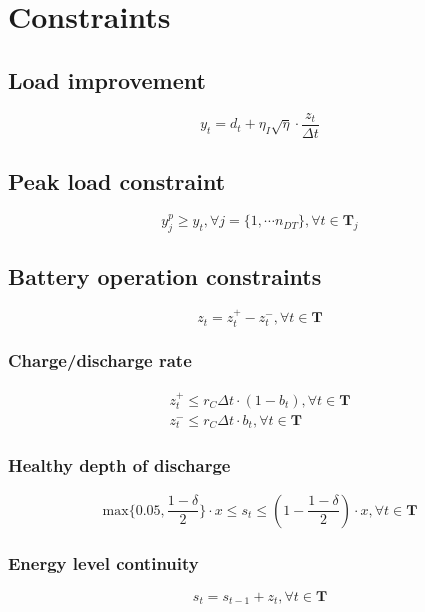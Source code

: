 \documentclass[11pt]{article}
\begin{document}
\section{Constraints}

\subsection{Load improvement}
\begin{equation}
y_t = d_t + \eta_I \sqrt{\eta} \cdot \frac{z_t}{\Delta t}
\end{equation}

\subsection{Peak load constraint}
\begin{equation}
y^p_j \ge y_t, \forall j=\{1, \cdots n_{DT} \}, \forall t \in \textbf{T}_j
\end{equation}

\subsection{Battery operation constraints}
\begin{equation}
z_t = z^+_t - z^-_t, \forall t \in \textbf{T}
\end{equation}

\subsubsection{Charge/discharge rate}
\begin{eqnarray}
z^+_t \le r_C \Delta t \cdot (1 - b_t), \forall t \in \textbf{T} \\
z^-_t \le r_C \Delta t \cdot b_t, \forall t \in \textbf{T}
\end{eqnarray}

\subsubsection{Healthy depth of discharge}
\begin{equation}
\text{max} \{ 0.05, \frac{1-\delta}{2} \} \cdot x
\le 
s_t 
\le 
\left( 1 -  \frac{1-\delta}{2} \right) \cdot x,
\forall t \in \textbf{T}
\end{equation}

\subsubsection{Energy level continuity}
\begin{equation}
s_t = s_{t-1} + z_t, \forall t \in \textbf{T}
\end{equation}
\end{document}
